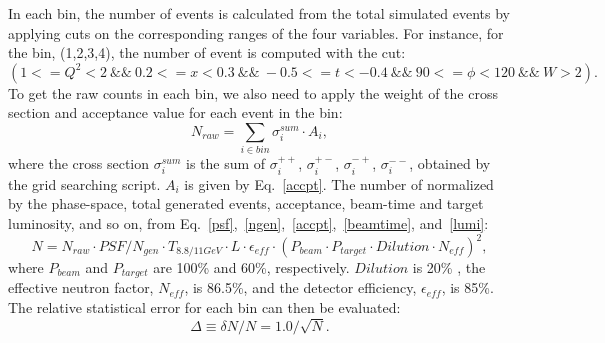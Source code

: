 \documentclass[a4paper,10.5pt]{article}
\begin{document}
 In each bin, the number of events is calculated from the total simulated events by applying cuts on the corresponding ranges of the four variables. For instance, for the bin, (1,2,3,4), the number of event is computed with the cut:
  \begin{equation*}
     (1<=Q^{2}<2~\&\&~0.2<=x<0.3~\&\&~-0.5<=t<-0.4~\&\&~90<=\phi<120~\&\&~W>2).
  \end{equation*}
To get the raw counts in each bin, we also need to apply the weight of the cross section and acceptance value for each event in the bin:
 \begin{equation}
    N_{raw} = \sum_{i\in bin} \sigma^{sum}_{i}\cdot A_{i},
 \end{equation}
 where the cross section $\sigma^{sum}_{i}$ is the sum of $\sigma^{++}_{i}$, $\sigma^{+-}_{i}$, $\sigma^{-+}_{i}$, $\sigma^{--}_{i}$, obtained by the grid searching script. $A_{i}$ is given by Eq.~\ref{accpt}. The number of normalized by the phase-space, total generated events, acceptance, beam-time and target luminosity, and so on, from Eq.~\ref{psf},~\ref{ngen},~\ref{accpt},~\ref{beamtime}, and~\ref{lumi}:
 \begin{equation}
     N = N_{raw} \cdot PSF/N_{gen} \cdot T_{8.8/11GeV} \cdot L \cdot \epsilon_{eff} \cdot (P_{beam}\cdot P_{target}\cdot Dilution\cdot N_{eff})^{2},
     \label{ncount}
 \end{equation}
where $P_{beam}$ and  $P_{target}$ are 100\% and 60\%, respectively. $Dilution$ is 20\% , the effective neutron factor, $N_{eff}$, is 86.5\%, and the detector efficiency, $\epsilon_{eff}$, is 85\%. The relative statistical error for each bin can then be evaluated:
 \begin{equation}
      \Delta \equiv \delta N/N = 1.0/\sqrt{N}. 
      \label{staterr}
 \end{equation}
\end{document}
